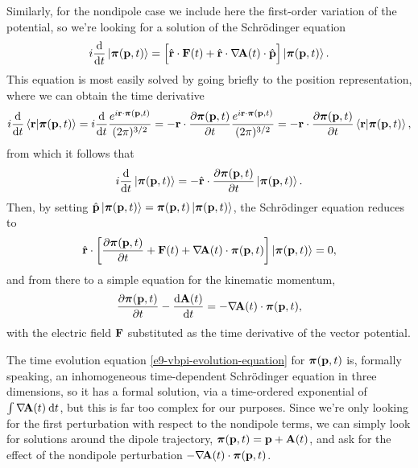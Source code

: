 Similarly, for the nondipole case we include here the first-order variation of the potential, so we're looking for a solution of the Schrödinger equation
\begin{equation}
i\frac{\mathrm{d}}{\mathrm{d} t}\ket{\boldsymbol{\pi}(\vb{p},t)} 
= 
\left[\vphantom{\sum} \hat {\vb{r}}\cdot\vb{F}(t) + \hat{\vb{r}}\cdot\nabla\!\vb{A}(t)\cdot\hat{\vb{p}} \right]
\ket{\boldsymbol{\pi}(\vb{p},t)}.
\end{equation}
This equation is most easily solved by going briefly to the position representation, where we can obtain the time derivative
\begin{equation}
i\frac{\mathrm{d}}{\mathrm{d} t} \braket{\vb{r}}{\boldsymbol{\pi}(\vb{p},t)} 
=
i\frac{\mathrm{d}}{\mathrm{d} t} \frac{e^{i\vb{r} \cdot \boldsymbol{\pi}(\vb{p},t)}}{(2\pi)^{3/2}}
=
-\vb{r} \cdot \frac{\partial\boldsymbol{\pi}(\vb{p},t)}{\partial t}\frac{e^{i\vb{r} \cdot \boldsymbol{\pi}(\vb{p},t)}}{(2\pi)^{3/2}}
=
-\vb{r} \cdot \frac{\partial\boldsymbol{\pi}(\vb{p},t)}{\partial t} \braket{\vb{r}}{\boldsymbol{\pi}(\vb{p},t)}
,
\end{equation}
from which it follows that
\begin{equation}
i\frac{\mathrm{d}}{\mathrm{d} t} \ket{\boldsymbol{\pi}(\vb{p},t)} 
=
-\hat {\vb{r}} \cdot \frac{\partial\boldsymbol{\pi}(\vb{p},t)}{\partial t} \ket{\boldsymbol{\pi}(\vb{p},t)}
.
\end{equation}
Then, by setting $\hat{\vb{p}} \ket{\boldsymbol{\pi}(\vb{p},t)} = \boldsymbol{\pi}(\vb{p},t) \ket{\boldsymbol{\pi}(\vb{p},t)}$, the Schrödinger equation reduces to 
\begin{equation}
\hat {\vb{r}}\cdot \left[
 \vphantom{\sum} 
 \frac{\partial\boldsymbol{\pi}(\vb{p},t)}{\partial t}
 + \vb{F}(t) 
 + \nabla\!\vb{A}(t)\cdot \boldsymbol{\pi}(\vb{p},t)
\right]
\ket{\boldsymbol{\pi}(\vb{p},t)}
=0
,
\end{equation}
and from there to a simple equation for the kinematic momentum,
\begin{equation}
\frac{\partial\boldsymbol{\pi}(\vb{p},t)}{\partial t}
- \frac{\mathrm{d} \vb{A}(t)}{\mathrm{d} t}
=
-\nabla\!\vb{A}(t)\cdot \boldsymbol{\pi}(\vb{p},t)
,
\label{e9-vbpi-evolution-equation}
\end{equation}
with the electric field $\vb{F}$ substituted as the time derivative of the vector potential.


The time evolution equation \eqref{e9-vbpi-evolution-equation} for $\boldsymbol{\pi}(\vb{p},t)$ is, formally speaking, an inhomogeneous time-dependent Schrödinger equation in three dimensions,  so it has a formal solution, via a time-ordered exponential of $\int \nabla\!\vb{A}(t)\:\mathrm{d} t$, but this is far too complex for our purposes. Since we're only looking for the first perturbation with respect to the nondipole terms, we can simply look for solutions around the dipole trajectory, $\boldsymbol{\pi}( \vb{p},t) =\vb{p}+\vb{A}(t)$, and ask for the effect of the nondipole perturbation $-\nabla\!\vb{A}(t)\cdot \boldsymbol{\pi}(\vb{p},t)$.

